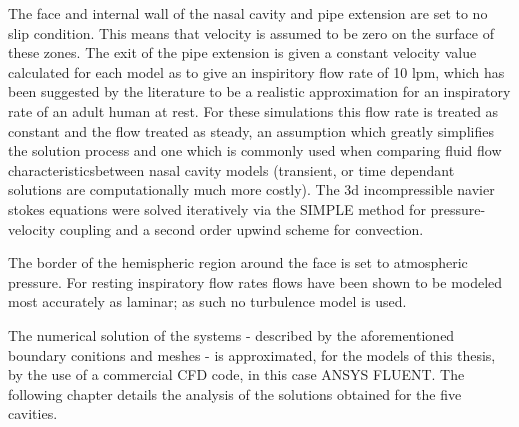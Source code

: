 The face and internal wall of the nasal cavity and pipe extension are set to no slip condition. This means that velocity is assumed to be zero on the surface of these zones. The exit of the pipe extension is given a constant velocity value calculated for each model as to give an inspiritory flow rate of 10 lpm, which has been suggested by the literature to be a realistic approximation for an inspiratory rate of an adult human at rest. For these simulations this flow rate is treated as constant and the flow treated as steady, an assumption which greatly simplifies the solution process and one which is commonly used when comparing fluid flow characteristicsbetween nasal cavity models (transient, or time dependant solutions are computationally much more costly). The 3d incompressible navier stokes equations were solved iteratively via the SIMPLE method for pressure-velocity coupling and a second order upwind scheme for convection.

The border of the hemispheric region around the face is set to atmospheric pressure. For resting inspiratory flow rates flows have been shown to be modeled most accurately as laminar; as such no turbulence model is used.

The numerical solution of the systems - described by the aforementioned boundary conitions and meshes - is approximated, for the models of this thesis, by the use of a commercial CFD code, in this case ANSYS FLUENT. The following chapter details the analysis of the solutions obtained for the five cavities.
